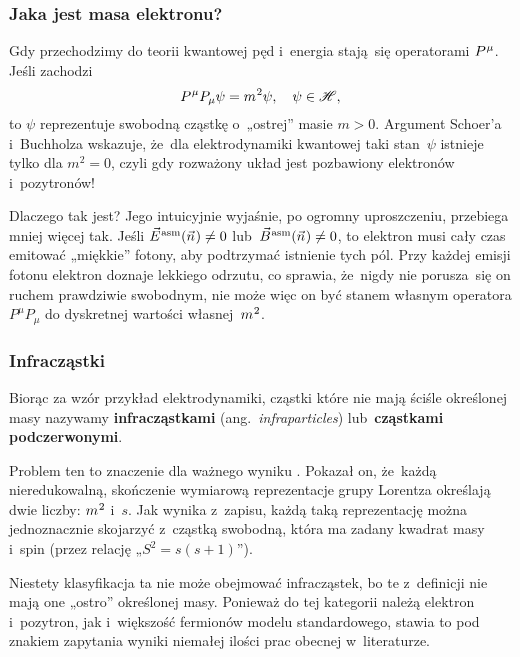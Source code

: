 \documentclass[10pt,t]{beamer}
\begin{document}
\begin{frame}
  \frametitle{Jaka jest masa elektronu?}


  Gdy przechodzimy do teorii kwantowej pęd i~energia stają~się operatorami
  $P^{ \hspace{0.05em} \mu }$. Jeśli zachodzi
  \begin{equation}
    \label{eq:Glowne-rodzaje-problemow-podczerwonych-13}
    P^{ \hspace{0.05em} \mu } P_{ \mu } \psi  = m^{ \hspace{0.05em} 2 } \psi, \quad
    \psi \in \mathcal{H},
  \end{equation}
  to $\psi$ reprezentuje swobodną cząstkę o~„ostrej” masie $m > 0$.
  Argument Schoer’a i~Buchholza wskazuje, że~dla elektrodynamiki kwantowej
  taki stan~$\psi$ istnieje tylko dla $m^{ 2 } = 0$, czyli gdy rozważony układ
  jest pozbawiony elektronów i~pozytronów!

  Dlaczego tak jest? Jego intuicyjnie wyjaśnie, po ogromny uproszczeniu,
  przebiega mniej więcej tak. Jeśli $\vec{E}^{ \hspace{0.05em} \text{asm} }( \vec{n} \hspace{0.05em} ) \neq 0$ lub~$\vec{B}^{ \hspace{0.05em} \text{asm} }( \vec{n} \hspace{0.05em} ) \neq 0$, to
  elektron musi cały czas emitować „miękkie” fotony, aby podtrzymać
  istnienie tych pól. Przy każdej emisji fotonu elektron doznaje lekkiego
  odrzutu, co sprawia, że~nigdy nie porusza~się on ruchem prawdziwie
  swobodnym, nie może więc on być stanem własnym operatora
  $P^{ \mu } P_{ \mu }$ do dyskretnej wartości własnej~$m^{ \hspace{0.05em} 2 }$.

\end{frame}





\begin{frame}
  \frametitle{Infracząstki}


  Biorąc za wzór przykład elektrodynamiki, cząstki które nie mają ściśle
  określonej masy nazywamy \textbf{infracząstkami}
  (ang.~\textit{infraparticles}) lub~\textbf{cząstkami podczerwonymi}.

  Problem ten to znaczenie dla ważnego wyniku
  .
  Pokazał on, że~każdą nieredukowalną, skończenie wymiarową reprezentacje
  grupy Lorentza określają dwie liczby: $m^{ \hspace{0.05em} 2 }$ i~$s$. Jak
  wynika z~zapisu, każdą taką reprezentację można jednoznacznie skojarzyć
  z~cząstką swobodną, która ma zadany kwadrat masy i~spin (przez relację
  „$S^{ 2 } = s ( s + 1 )$”).

  Niestety klasyfikacja ta \alert{nie} może obejmować infracząstek, bo
  te z~definicji nie mają one „ostro” określonej masy. Ponieważ do tej
  kategorii należą elektron i~pozytron, jak i~większość fermionów modelu
  standardowego, stawia to pod znakiem zapytania wyniki niemałej ilości
  prac obecnej w~literaturze.

\end{frame}
\end{document}

